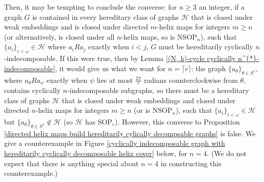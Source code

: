 \documentclass{amsart}
\theoremstyle{definition}
\theoremstyle{remark}
\numberwithin{equation}{section}
\begin{document}
Then, it may be tempting to conclude the converse: for $n \geq 3$ an integer, if a graph $G$ is contained in every hereditary class of graphs $\mathcal{H}$ that is closed under weak embeddings and is closed under directed $m$-helix maps for integers $m \geq n$ (or alternatively, is closed under all $n$-helix maps, so is $\mathrm{NSOP}_{n}$), such that $\{a_{i}\}_{i < \omega} \in \mathcal{H}$ where $a_{i} R a_{j}$ exactly when $i < j$, $G$ must be hereditarily cyclically $n$-indecomposable. If this were true, then by Lemma  \ref{(N, k)-cycle cyclically n^{*}-indecomposable}, it would give us what we want for $n = \lceil r \rceil$: the graph $\{a_{\theta}\}_{\theta \in S^{1}}$, where $a_{\theta} R a_{\psi}$ exactly when $\psi$ lies at most $\frac{2\pi}{r}$ radians counterclockwise from $\theta$, contains cyclically $n$-indecomposable subgraphs, so there must be a hereditary class of graphs $\mathcal{H}$ that is closed under weak embeddings and closed under directed $n$-helix maps for integers $m \geq n$ (or is $\mathrm{NSOP}_{n}$), such that $\{a_{i}\}_{i < \omega} \in \mathcal{H}$ but $\{a_{\theta}\}_{\theta \in S^{1}} \notin \mathcal{H}$ (so $\mathcal{H}$ has $\mathrm{SOP}_{r}$). However, this converse to Proposition \ref{directed helix maps build hereditarily cylically decompsable graphs} is false. We give a counterexample in Figure \ref{cyclically indecomposable graph with hereditarily cyclically decomposable helix cover} below, for $n = 4$. (We do not expect that there is anything special about $n=4$ in constructing this counterexample.)
\end{document}
